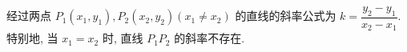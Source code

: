 
经过两点 $P_{1}\left(x_{1}, y_{1}\right), P_{2}\left(x_{2}, y_{2}\right)\left(x_{1} \neq x_{2}\right)$ 的直线的斜率公式为 $k=\dfrac{y_{2}-y_{1}}{x_{2}-x_{1}}$. 特别地, 当 $x_{1}=x_{2}$ 时, 直线 $P_{1} P_{2}$ 的斜率不存在.